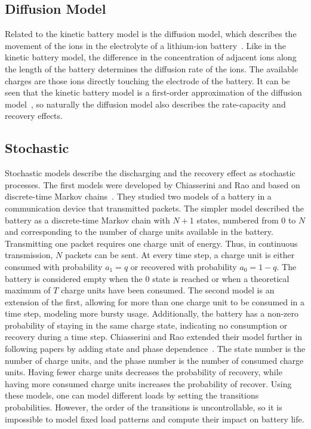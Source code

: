 \documentclass[../zhang_thesis.tex]{subfiles}
\begin{document}
\subsection{Diffusion Model}

Related to the kinetic battery model is the diffusion model, which describes the movement of the ions in the electrolyte of a lithium-ion battery~\cite{rakhmatov01}. Like in the kinetic battery model, the difference in the concentration of adjacent ions along the length of the battery determines the diffusion rate of the ions. The available charges are those ions directly touching the electrode of the battery. It can be seen that the kinetic battery model is a first-order approximation of the diffusion
model~\cite{jongerden09}, so naturally the diffusion model also describes the rate-capacity and recovery effects.

\subsection{Stochastic}

Stochastic models describe the discharging and the recovery effect as stochastic processes. The first models were developed by Chiasserini and Rao and based on discrete-time Markov chains~\cite{chiasserini99b}. They studied two models of a battery in a communication device that transmitted packets. The simpler model described the battery as a discrete-time Markov chain with $N+1$ states, numbered from $0$ to $N$ and corresponding to the number of charge units available in the battery.
Transmitting one packet requires one charge unit of energy. Thus, in continuous transmission, $N$ packets can be sent. At every time step, a charge unit is either consumed with probability $a_1=q$ or recovered with probability $a_0=1-q$. The battery is considered empty when the $0$ state is reached or when a theoretical maximum of $T$ charge units have been consumed. The second model is an extension of the first, allowing for more than one charge unit to be consumed in a time step, modeling
more bursty usage. Additionally, the battery has a non-zero probability of staying in the same charge state, indicating no consumption or recovery during a time step. Chiasserini and Rao extended their model further in following papers by adding state and phase dependence~\cite{chiasserini99,chiasserini01,chiasserini01b}. The state number is the number of charge units, and the phase number is the number of consumed charge units. Having fewer charge units decreases the probability of
recovery, while having more consumed charge units increases the probability of recover. Using these models, one can model different loads by setting the transitions probabilities. However, the order of the transitions is uncontrollable, so it is impossible to model fixed load patterns and compute their impact on battery life.
\end{document}
